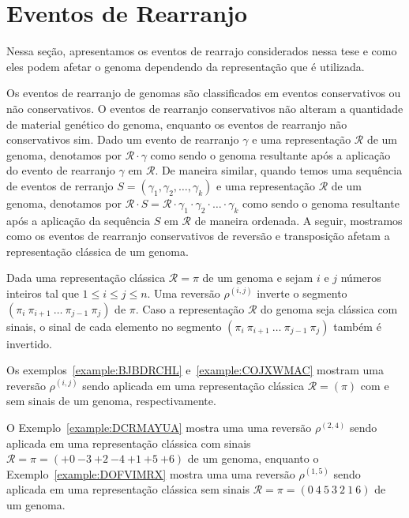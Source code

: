 \section{Eventos de Rearranjo}

Nessa seção, apresentamos os eventos de rearrajo considerados nessa tese e como eles podem afetar o genoma dependendo da representação que é utilizada. 

Os eventos de rearranjo de genomas são classificados em eventos conservativos ou não conservativos. O eventos de rearranjo conservativos não alteram a quantidade de material genético do genoma, enquanto os eventos de rearranjo não conservativos sim. Dado um evento de rearranjo $\gamma$ e uma representação $\mathcal{R}$ de um genoma, denotamos por $\mathcal{R} \cdot  \gamma$ como sendo o genoma resultante após a aplicação do evento de rearranjo $\gamma$ em $\mathcal{R}$. De maneira similar, quando temos uma sequência de eventos de rerranjo $S=(\gamma_1,\gamma_2,\dots,\gamma_k)$ e uma representação $\mathcal{R}$ de um genoma, denotamos por $\mathcal{R} \cdot S = \mathcal{R} \cdot \gamma_1 \cdot \gamma_2 \cdot \dots \cdot \gamma_k$ como sendo o genoma resultante após a aplicação da sequência $S$ em $\mathcal{R}$ de maneira ordenada. A seguir, mostramos como os eventos de rearranjo conservativos de reversão e transposição afetam a representação clássica de um genoma.

\begin{definition}
Dada uma representação clássica $\mathcal{R} = \pi$ de um genoma e sejam $i$ e $j$ números inteiros tal que $1 \le i \le j \le n$. Uma reversão $\rho^{(i,j)}$ inverte o segmento $(\pi_i~\pi_{i+1}~\dots~\pi_{j-1}~\pi_j)$ de $\pi$. Caso a representação $\mathcal{R}$ do genoma seja clássica com sinais, o sinal de cada elemento no segmento $(\pi_i~\pi_{i+1}~\dots~\pi_{j-1}~\pi_j)$ também é invertido.
\end{definition}

Os exemplos~\ref{example:BJBDRCHL} e~\ref{example:COJXWMAC} mostram uma reversão $\rho^{(i,j)}$ sendo aplicada em uma representação clássica $\mathcal{R} = (\pi)$ com e sem sinais de um genoma, respectivamente.





O Exemplo~\ref{example:DCRMAYUA} mostra uma uma reversão $\rho^{(2,4)}$ sendo aplicada em uma representação clássica com sinais $\mathcal{R} = \pi = ({+0}~{-3}~{+2}~{-4}~{+1}~{+5}~{+6})$ de um genoma, enquanto o Exemplo~\ref{example:DOFVIMRX} mostra uma uma reversão $\rho^{(1,5)}$ sendo aplicada em uma representação clássica sem sinais $\mathcal{R} = \pi = ({0}~{4}~{5}~{3}~{2}~{1}~{6})$ de um genoma.


